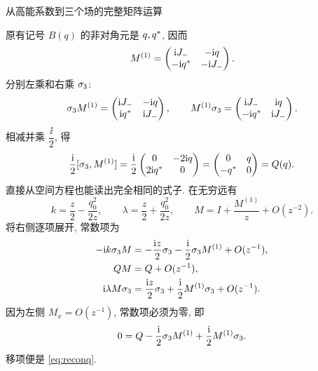 \par\medskip\noindent 从高能系数到三个场的完整矩阵运算\par
原有记号 $B(q)$ 的非对角元是 $q,{q}^{*}$, 因而
\begin{equation*}
M^{(1)}=
\begin{pmatrix}
\mathrm{i} J_-&-\mathrm{i} q\\
-\mathrm{i}{q}^{*}&-\mathrm{i} J_-
\end{pmatrix}.
\end{equation*}
分别左乘和右乘 $\sigma_3$:
\begin{equation*}
\sigma_3 M^{(1)}=
\begin{pmatrix}
\mathrm{i} J_-&-\mathrm{i} q\\
\mathrm{i}{q}^{*}&\mathrm{i} J_-
\end{pmatrix},\qquad
M^{(1)}\sigma_3=
\begin{pmatrix}
\mathrm{i} J_-&\mathrm{i} q\\
-\mathrm{i}{q}^{*}&\mathrm{i} J_-
\end{pmatrix}.
\end{equation*}
相减并乘 $\dfrac{\ii}{2}$, 得
\begin{equation*}
\dfrac{\mathrm{i}}{2}[\sigma_3,M^{(1)}]
=\dfrac{\mathrm{i}}{2}
\begin{pmatrix}
0&-2\mathrm{i} q\\
2\mathrm{i}{q}^{*}&0
\end{pmatrix}
=\begin{pmatrix}
0&q\\-{q}^{*}&0
\end{pmatrix}=Q(q).
\end{equation*}
直接从空间方程也能读出完全相同的式子.
在无穷远有
\begin{equation*}
k=\dfrac{z}{2}-\dfrac{q_0^2}{2z},\qquad
\lambda=\dfrac{z}{2}+\dfrac{q_0^2}{2z},\qquad
M=I+\dfrac{M^{(1)}}{z}+O(z^{-2}).
\end{equation*}
将右侧逐项展开, 常数项为
\begin{equation*}
\begin{aligned}
-\mathrm{i} k\sigma_3 M
&=-\dfrac{\mathrm{i} z}{2}\sigma_3
-\dfrac{\mathrm{i}}{2}\sigma_3 M^{(1)}+O(z^{-1}),\\
QM&=Q+O(z^{-1}),\\
\mathrm{i}\lambda M\sigma_3
&=\dfrac{\mathrm{i} z}{2}\sigma_3
+\dfrac{\mathrm{i}}{2}M^{(1)}\sigma_3+O(z^{-1}).
\end{aligned}
\end{equation*}
因为左侧 $M_x=O(z^{-1})$, 常数项必须为零, 即
\begin{equation*}
0=Q-\dfrac{\mathrm{i}}{2}\sigma_3 M^{(1)}
+\dfrac{\mathrm{i}}{2}M^{(1)}\sigma_3.
\end{equation*}
移项便是 \eqref{eq:reconq}.

